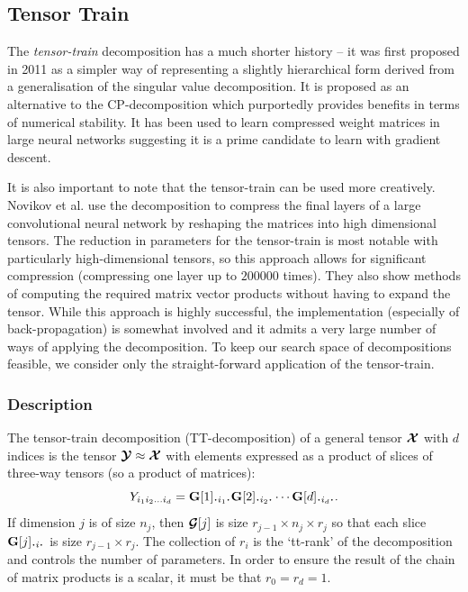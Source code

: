 \subsection{Tensor Train} %
The \emph{tensor-train} decomposition has a much shorter history -- it was first proposed in
2011 as a simpler way of representing a slightly hierarchical form derived from a
generalisation of the singular value decomposition. \autocite{Osedelets2011} It is proposed
as an alternative to the CP-decomposition which purportedly provides benefits in terms of
numerical stability. It has been used to learn compressed weight matrices in large neural
networks \autocite{Novikov} suggesting it is a prime candidate to learn with gradient descent.

It is also important to note that the tensor-train can be used more creatively. 
Novikov et al. \autocite{Novikov} use the decomposition to compress the final layers of a 
large convolutional neural
network by reshaping the matrices into high dimensional tensors. The reduction in parameters for
the tensor-train is most notable with particularly high-dimensional tensors, so this approach allows
for significant compression (compressing one layer up to \(200000\) times).
They also show methods of computing the required matrix vector products
without having to expand the tensor. While this approach is highly successful, the implementation
(especially of back-propagation) is somewhat involved and it admits a very large number of ways of
applying the decomposition. To keep our search space of decompositions feasible, we consider only
the straight-forward application of the tensor-train.

\subsubsection{Description}
The tensor-train decomposition (TT-decomposition) of a general tensor \(\bm{\mathcal{X}}\) with
\(d\) indices is the tensor \(\bm{\mathcal{Y}} \approx\bm{\mathcal{X}}\) with elements expressed as a
product of slices of three-way tensors (so a product of matrices):
\begin{equation}
			\label{eq:tensortrain_full}
	{Y}_{i_1i_2\dots i_d} 
		= \mat{G}[1]_{\midbullet i_1 \midbullet}\mat{G}[2]_{\midbullet i_2 \midbullet}
			\cdots \mat{G}[d]_{\midbullet i_d \midbullet}.
\end{equation}
If dimension \(j\) is of size \(n_j\), then \(\bm{\mathcal{G}}[j]\) is size 
\(r_{j-1} \times n_j \times r_{j}\) so that each slice \(\mat{G}[j]_{\midbullet i \midbullet}\)
is size \(r_{j-1} \times r_{j}\). The collection of \(r_i\) is the `tt-rank' of the
decomposition and controls the number of parameters. In order to ensure the result of the chain
of matrix products is a scalar, it must be that \(r_0 = r_d = 1\). \autocite{Osedelets2011}

